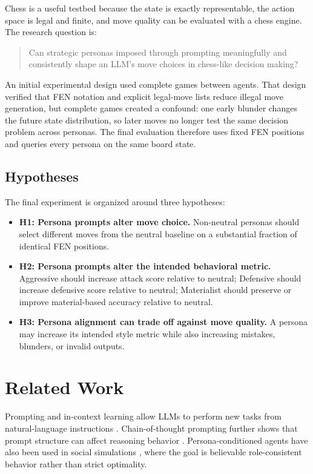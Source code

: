 \documentclass[10pt]{article}
\begin{document}
Chess is a useful testbed because the state is exactly representable, the action space is legal and finite, and move quality can be evaluated with a chess engine. The research question is:

\begin{quote}
Can strategic personas imposed through prompting meaningfully and consistently shape an LLM's move choices in chess-like decision making?
\end{quote}

An initial experimental design used complete games between agents. That design verified that FEN notation and explicit legal-move lists reduce illegal move generation, but complete games created a confound: one early blunder changes the future state distribution, so later moves no longer test the same decision problem across personas. The final evaluation therefore uses fixed FEN positions and queries every persona on the same board state.

\subsection{Hypotheses}

The final experiment is organized around three hypotheses:

\begin{itemize}
    \item \textbf{H1: Persona prompts alter move choice.} Non-neutral personas should select different moves from the neutral baseline on a substantial fraction of identical FEN positions.
    \item \textbf{H2: Persona prompts alter the intended behavioral metric.} Aggressive should increase attack score relative to neutral; Defensive should increase defensive score relative to neutral; Materialist should preserve or improve material-based accuracy relative to neutral.
    \item \textbf{H3: Persona alignment can trade off against move quality.} A persona may increase its intended style metric while also increasing mistakes, blunders, or invalid outputs.
\end{itemize}

\section{Related Work}

Prompting and in-context learning allow LLMs to perform new tasks from natural-language instructions \citep{brown2020language}. Chain-of-thought prompting further shows that prompt structure can affect reasoning behavior \citep{wei2022chain}. Persona-conditioned agents have also been used in social simulations \citep{park2023generative}, where the goal is believable role-consistent behavior rather than strict optimality.
\end{document}
